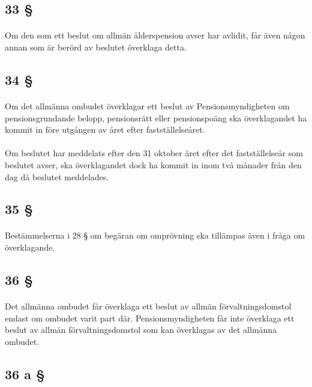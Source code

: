 \documentclass[a4paper,notitlepage,openany,10pt]{book}
\begin{document}
\subsection*{33 §}
\paragraph*{}
Om den som ett beslut om allmän ålderspension avser har avlidit, får även någon annan som är berörd av beslutet överklaga detta.
\subsection*{34 §}
\paragraph*{}
Om det allmänna ombudet överklagar ett beslut av Pensionsmyndigheten om pensionsgrundande belopp, pensionsrätt eller pensionspoäng ska överklagandet ha kommit in före utgången av året efter fastställelseåret.
\paragraph*{}
Om beslutet har meddelats efter den 31 oktober året efter det fastställelseår som beslutet avser, ska överklagandet dock ha kommit in inom två månader från den dag då beslutet meddelades.
\subsection*{35 §}
\paragraph*{}
Bestämmelserna i 28 § om begäran om omprövning ska tillämpas även i fråga om överklagande.
\subsection*{36 §}
\paragraph*{}
Det allmänna ombudet får överklaga ett beslut av allmän förvaltningsdomstol endast om ombudet varit part där.
Pensionsmyndigheten får inte överklaga ett beslut av allmän förvaltningsdomstol som kan överklagas av det allmänna ombudet.
\subsection*{36 a §}
\end{document}
